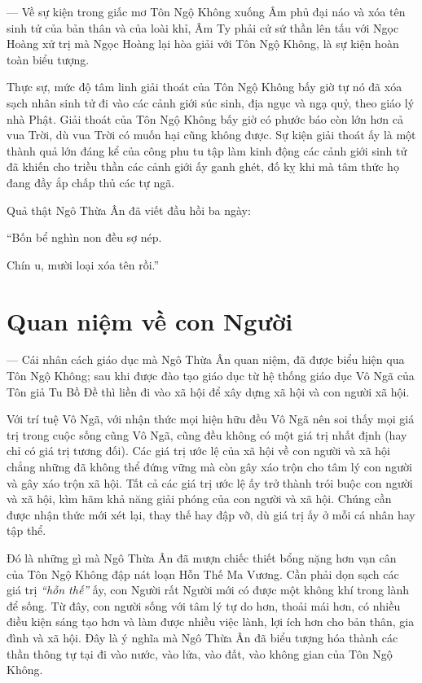 --- Về sự kiện trong giấc mơ Tôn Ngộ Không xuống Âm phủ đại náo và xóa tên sinh tử của bản thân và của loài khỉ, Âm Ty phải cử sứ thần lên tấu với Ngọc Hoàng xử trị mà Ngọc Hoàng lại hòa giải với Tôn Ngộ Không, là sự kiện hoàn toàn biểu tượng.

Thực sự, mức độ tâm linh giải thoát của Tôn Ngộ Không bấy giờ tự nó đã xóa sạch nhân sinh tử đi vào các cảnh giới súc sinh, địa ngục và ngạ quỷ, theo giáo lý nhà Phật. Giải thoát của Tôn Ngộ Không bấy giờ có phước báo còn lớn hơn cả vua Trời, dù vua Trời có muốn hại cũng không được. Sự kiện giải thoát ấy là một thành quả lớn đáng kể của công phu tu tập làm kinh động các cảnh giới sinh tử đã khiến cho triều thần các cảnh giới ấy ganh ghét, đố kỵ khi mà tâm thức họ đang đầy ắp chấp thủ các tự ngã.

Quả thật Ngô Thừa Ân đã viết đầu hồi ba ngày:

\begin{itshape}
``Bốn bể nghìn non đều sợ nép.

Chín u, mười loại xóa tên rồi.''
\end{itshape}


\section{Quan niệm về con Người} %
\label{sec:3_quan_niem_con_nguoi}

--- Cái nhân cách giáo dục mà Ngô Thừa Ân quan niệm, đã được biểu hiện qua Tôn Ngộ Không; sau khi được đào tạo giáo dục từ hệ thống giáo dục Vô Ngã của Tôn giả Tu Bồ Đề thì liền đi vào xã hội để xây dựng xã hội và con người xã hội.

Với trí tuệ Vô Ngã, với nhận thức mọi hiện hữu đều Vô Ngã nên soi thấy mọi giá trị trong cuộc sống cũng Vô Ngã, cũng đều không có một giá trị nhất định (hay chỉ có giá trị tương đối). Các giá trị ước lệ của xã hội về con người và xã hội chẳng những đã không thể đứng vững mà còn gây xáo trộn cho tâm lý con người và gây xáo trộn xã hội. Tất cả các giá trị ước lệ ấy trở thành trói buộc con người và xã hội, kìm hãm khả năng giải phóng của con người và xã hội. Chúng cần được nhận thức mới xét lại, thay thế hay đập vỡ, dù giá trị ấy ở mỗi cá nhân hay tập thể.

Đó là những gì mà Ngô Thừa Ân đã mượn chiếc thiết bổng nặng hơn vạn cân của Tôn Ngộ Không đập nát loạn Hỗn Thế Ma Vương. Cần phải dọn sạch các giá trị \emph{``hỗn thế''} ấy, con Người rất Người mới có được một không khí trong lành để sống. Từ đây, con người sống với tâm lý tự do hơn, thoải mái hơn, có nhiều điều kiện sáng tạo hơn và làm được nhiều việc lành, lợi ích hơn cho bản thân, gia đình và xã hội. Đây là ý nghĩa mà Ngô Thừa Ân đã biểu tượng hóa thành các thần thông tự tại đi vào nước, vào lửa, vào đất, vào không gian của Tôn Ngộ Không.


